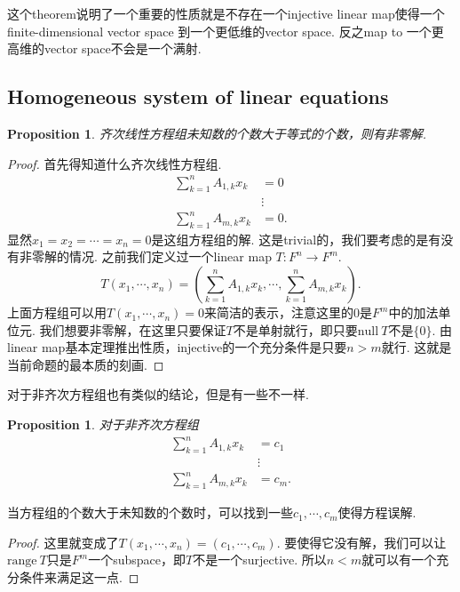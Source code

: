 \documentclass{article}
\newtheorem{proposition}[theorem]{Proposition}
\newcommand*{\xfunc}[4]{{#2}\colon{#3}{#1}{#4}}
\newcommand*{\func}[3]{\xfunc{\to}{#1}{#2}{#3}}
\newcommand\nul[1]{\text{null}\ #1}
\newcommand\range[1]{\text{range}\ #1}
\begin{document}
{\color{red} 这个theorem说明了一个重要的性质就是不存在一个injective linear map使得一个finite-dimensional vector space 到一个更低维的vector space}. {\color{blue}反之map to 一个更高维的vector space不会是一个满射}. 

\newpage
\subsection{Homogeneous system of linear equations}

\begin{proposition}
齐次线性方程组未知数的个数大于等式的个数，则有非零解.
\end{proposition}

\begin{proof}
首先得知道什么齐次线性方程组.
$$
\begin{aligned}
\sum\limits_{k=1}^{n}A_{1,k}x_k&=0 \\
&\vdots\\
\sum\limits_{k=1}^{n}A_{m,k}x_k&=0.
\end{aligned}
$$
显然$x_1=x_2=\cdots=x_n = 0$是这组方程组的解. 这是trivial的，我们要考虑的是有没有非零解的情况. 之前我们定义过一个linear map $\func{T}{F^n}{F^m}$.
$$
	T(x_1,\cdots,x_n)  = (\sum\limits_{k=1}^{n}A_{1,k}x_k,\cdots,\sum\limits_{k=1}^{n}A_{m,k}x_k).
$$
上面方程组可以用$T(x_1,\cdots,x_n)=0$来简洁的表示，注意这里的$0$是$F^m$中的加法单位元. 我们想要非零解，在这里只要保证$T$不是单射就行，即只要$\nul{T}$不是$\{0\}$. 由linear map基本定理推出性质，injective的一个充分条件是只要$n>m$就行. 这就是当前命题的最本质的刻画.
\end{proof}

{\color{red} 对于非齐次方程组也有类似的结论，但是有一些不一样}.

\begin{proposition}
对于非齐次方程组
$$
\begin{aligned}
\sum\limits_{k=1}^{n}A_{1,k}x_k&=c_1 \\
&\vdots\\
\sum\limits_{k=1}^{n}A_{m,k}x_k&=c_m.
\end{aligned}
$$
\end{proposition}
当方程组的个数大于未知数的个数时，可以找到一些$c_1,\cdots,c_m$使得方程误解.

\begin{proof}
这里就变成了$T(x_1,\cdots,x_n) =  (c_1,\cdots,c_m)$. 要使得它没有解，我们可以让$\range{T}$只是$F^m$一个subspace，即$T$不是一个surjective. 所以$n<m$就可以有一个充分条件来满足这一点.
\end{proof}
\end{document}
